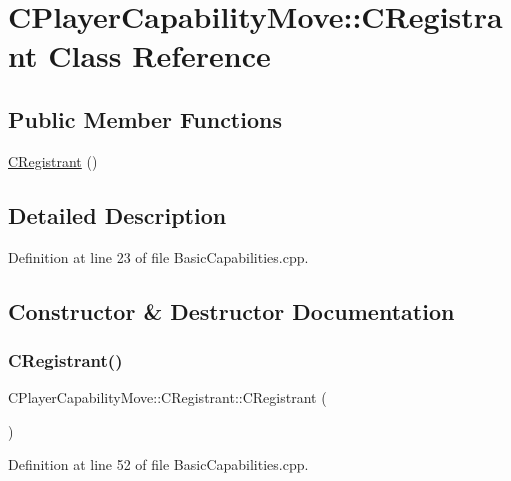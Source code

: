 \hypertarget{classCPlayerCapabilityMove_1_1CRegistrant}{}\section{C\+Player\+Capability\+Move\+:\+:C\+Registrant Class Reference}
\label{classCPlayerCapabilityMove_1_1CRegistrant}
\subsection*{Public Member Functions}
\begin{DoxyCompactItemize}
\item 
\hyperlink{classCPlayerCapabilityMove_1_1CRegistrant_a9ee42fd2028701745555195a2e35922b}{C\+Registrant} ()
\end{DoxyCompactItemize}


\subsection{Detailed Description}


Definition at line 23 of file Basic\+Capabilities.\+cpp.



\subsection{Constructor \& Destructor Documentation}
\hypertarget{classCPlayerCapabilityMove_1_1CRegistrant_a9ee42fd2028701745555195a2e35922b}{}\label{classCPlayerCapabilityMove_1_1CRegistrant_a9ee42fd2028701745555195a2e35922b} 
\subsubsection{\texorpdfstring{C\+Registrant()}{CRegistrant()}}
{\footnotesize\ttfamily C\+Player\+Capability\+Move\+::\+C\+Registrant\+::\+C\+Registrant (\begin{DoxyParamCaption}{ }\end{DoxyParamCaption})}



Definition at line 52 of file Basic\+Capabilities.\+cpp.


